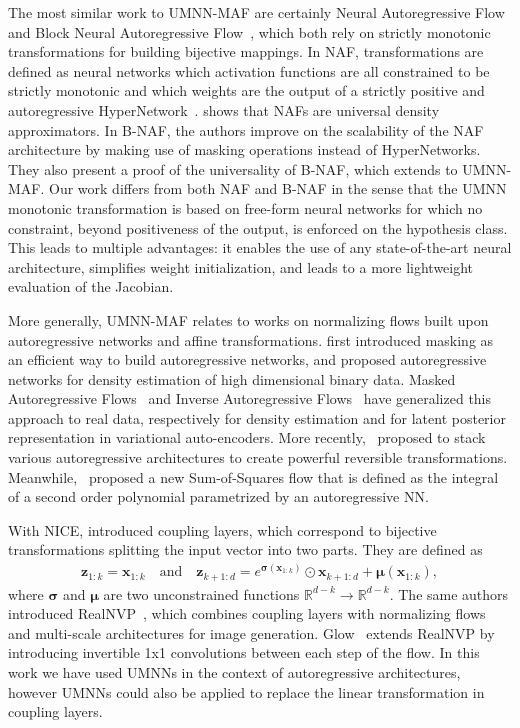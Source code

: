 The most similar work to UMNN-MAF are certainly Neural Autoregressive Flow~\citep[NAF, ][]{huang_neural_2018} and Block Neural Autoregressive Flow~\citep[B-NAF, ][]{de_cao_block_2020}, which both rely on strictly monotonic transformations for building bijective mappings.
In NAF, transformations are defined as neural networks which activation functions are all constrained to be strictly monotonic and which weights are the output of a strictly positive and autoregressive HyperNetwork~\citep{hypernetworks}.
\cite{huang_neural_2018} shows that NAFs are universal density approximators.
In B-NAF, the authors improve on the scalability of the NAF architecture by making use of masking operations instead of HyperNetworks. They also present a proof of the universality of B-NAF, which extends to UMNN-MAF.
Our work differs from both NAF and B-NAF in the sense that the UMNN monotonic transformation is based on free-form neural networks for which no constraint,  beyond positiveness of the output, is enforced on the hypothesis class.
This leads to multiple advantages: it enables the use of any state-of-the-art neural architecture, simplifies weight initialization, and leads to a more lightweight evaluation of the Jacobian.

More generally, UMNN-MAF relates to works on normalizing flows built upon autoregressive networks and affine transformations.
\cite{germain_made_2015} first introduced masking as an efficient way to build autoregressive networks, and proposed autoregressive networks for density estimation of high dimensional binary data.
Masked Autoregressive Flows~\citep{papamakarios_masked_2017} and Inverse Autoregressive Flows~\citep{kingma_improved_2016} have generalized this approach to real data, respectively for density estimation and for latent posterior representation in variational auto-encoders.
More recently, \cite{oliva_transformation_2018}~proposed to stack various autoregressive architectures to create powerful reversible transformations. Meanwhile, \cite{jaini_sum--squares_2019}~proposed a new Sum-of-Squares flow that is defined as the integral of a second order polynomial parametrized by an autoregressive NN.

With NICE, \cite{NICE} introduced coupling layers, which correspond to bijective transformations splitting the input vector into two parts. They are defined as
\begin{align}
    \mathbf{z}_{1:k} = \mathbf{x}_{1:k}\quad \text{and}\quad
    \mathbf{z}_{k+1:d} = e^{\mathbf{\sigma}(\mathbf{x}_{1:k})} \odot	 \mathbf{x}_{k+1:d} + \mathbf{\mu}(\mathbf{x}_{1:k}),
\end{align}
where $\mathbf{\sigma}$ and $\mathbf{\mu}$ are two unconstrained functions $\mathbb{R}^{d-k} \rightarrow \mathbb{R}^{d-k}$.
The same authors introduced RealNVP~\citep{dinh_density_2017}, which combines coupling layers with normalizing flows and multi-scale architectures for image generation.
Glow~\citep{kingma_glow_2018} extends RealNVP by introducing invertible 1x1 convolutions between each step of the flow.
In this work we have used UMNNs in the context of autoregressive architectures, however UMNNs could also be applied to replace the linear transformation in coupling layers.

